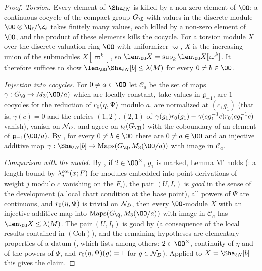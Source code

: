 \begin{proof}
\emph{Torsion.} Every element of $\Sha_{\ell N}$ is killed by a non-zero element of $\OO$: a continuous cocycle of the compact group
$G_\Q$ with values in the discrete module $\OO\otimes\eisQZ$ takes finitely many values, each killed by a non-zero element of $\OO$,
and the product of these elements kills the cocycle. For a torsion module $X$ over the discrete valuation ring $\OO$ with
uniformizer $\varpi$, $X$ is the increasing union of the submodules $X[\varpi^k]$, so $\len_\OO X=\sup_k\len_\OO X[\varpi^k]$.
It therefore suffices to show $\len_\OO\Sha_{\ell N}[b]\le\lambda(M)$ for every $0\ne b\in\OO$.

\emph{Injection into cocycles.} For $0\ne a\in\OO$ let $\mathcal C_a$ be the set of maps $\gamma:G_\Q\to M_3(\OO/a)$ which are
locally constant, take values in $\mathfrak g_{-1}$, are $1$-cocycles for the reduction of $r_0(\eta,\Psi)$ modulo $a$, are
normalized at $(c,g_1)$ (that is, $\gamma(c)=0$ and the entries $(1,2),(2,1)$ of
$\gamma(g_1)r_0(g_1)-\gamma(cg_1^{-1}c)r_0(cg_1^{-1}c)$ vanish), vanish on $\mathcal N_D$, and agree on $\iota_\ell(G_{\Ql})$ with
the coboundary of an element of $\mathfrak g_{-1}(\OO/a)$. By , for every $0\ne b\in\OO$ there are
$0\ne a\in\OO$ and an injective additive map $\gamma:\Sha_{\ell N}[b]\to\mathrm{Maps}(G_\Q,M_3(\OO/a))$ with image in $\mathcal C_a$.

\emph{Comparison with the model.} By , if $2\in\OO^\times$, $g_1$ is marked, Lemma M$'$
holds (: a length bound by $\lambda^{\mathrm{cot}}_j(x;F)$ for modules embedded into point derivations
of weight $j$ modulo $c$ vanishing on the $F_i$), the pair $(U,I_t)$ is \emph{good} in the sense of the development (a local
chart condition at the base point), all powers of $\Psi$ are continuous, and $r_0(\eta,\Psi)$ is trivial on $\mathcal N_D$, then every
$\OO$-module $X$ with an injective additive map into $\mathrm{Maps}(G_\Q,M_3(\OO/a))$ with image in $\mathcal C_a$ has
$\len_\OO X\le\lambda(M)$. The pair $(U,I_t)$ is good by  (a consequence of the local
results contained in $(\mathrm{Coh})$), and the remaining hypotheses are elementary properties of a datum
(, which lists among others: $2\in\OO^\times$, continuity of $\eta$ and of the powers of
$\Psi$, and $r_0(\eta,\Psi)(g)=1$ for $g\in\mathcal N_D$). Applied to $X=\Sha_{\ell N}[b]$ this gives the claim.
\end{proof}

